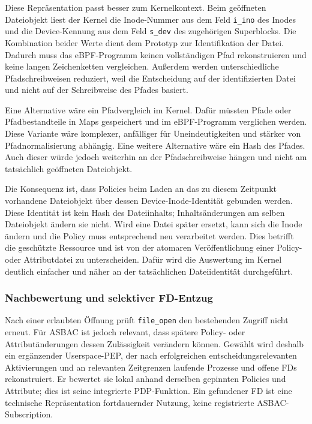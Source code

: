 Diese Repräsentation passt besser zum Kernelkontext.
Beim geöffneten Dateiobjekt liest der Kernel die Inode-Nummer aus dem Feld \texttt{i\_ino} des
Inodes und die Device-Kennung aus dem Feld \texttt{s\_dev} des zugehörigen Superblocks. Die
Kombination beider Werte dient dem Prototyp zur Identifikation der Datei.
Dadurch muss das eBPF-Programm keinen vollständigen Pfad rekonstruieren und keine langen Zeichenketten vergleichen.
Außerdem werden unterschiedliche Pfadschreibweisen reduziert, weil die Entscheidung auf der identifizierten Datei und nicht auf der Schreibweise des Pfades basiert.

Eine Alternative wäre ein Pfadvergleich im Kernel.
Dafür müssten Pfade oder Pfadbestandteile in Maps gespeichert und im eBPF-Programm verglichen werden.
Diese Variante wäre komplexer, anfälliger für Uneindeutigkeiten und stärker von Pfadnormalisierung abhängig.
Eine weitere Alternative wäre ein Hash des Pfades.
Auch dieser würde jedoch weiterhin an der Pfadschreibweise hängen und nicht am tatsächlich geöffneten Dateiobjekt.

Die Konsequenz ist, dass Policies beim Laden an das zu diesem Zeitpunkt vorhandene Dateiobjekt über dessen Device-Inode-Identität gebunden werden. Diese Identität ist kein Hash des Dateiinhalts; Inhaltsänderungen am selben Dateiobjekt ändern sie nicht.
Wird eine Datei später ersetzt, kann sich die Inode ändern und die Policy muss entsprechend neu verarbeitet werden.
Dies betrifft die geschützte Ressource und ist von der atomaren Veröffentlichung einer Policy- oder Attributdatei zu unterscheiden.
Dafür wird die Auswertung im Kernel deutlich einfacher und näher an der tatsächlichen Dateiidentität durchgeführt.

\subsubsection{Nachbewertung und selektiver FD-Entzug}\label{sec:nachbewertung-konzept}
Nach einer erlaubten Öffnung prüft \texttt{file\_open} den bestehenden Zugriff nicht erneut. Für ASBAC ist jedoch relevant, dass spätere Policy- oder Attributänderungen dessen Zulässigkeit verändern können. Gewählt wird deshalb ein ergänzender Userspace-PEP, der nach erfolgreichen entscheidungsrelevanten Aktivierungen und an relevanten Zeitgrenzen laufende Prozesse und offene FDs rekonstruiert. Er bewertet sie lokal anhand derselben gepinnten Policies und Attribute; dies ist seine integrierte PDP-Funktion. Ein gefundener FD ist eine technische Repräsentation fortdauernder Nutzung, keine registrierte ASBAC-Subscription.

